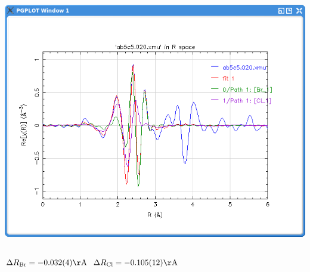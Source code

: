 \begin{frame}[fragile]
\begin{columns}[T]
\begin{column}{0.5\linewidth}
\begin{center}
        \includegraphics[width=0.9\linewidth]{images/abcfit_re}
      \end{center}

    \end{column}
  \end{columns}

  \medskip

  \begin{center}
    $\Delta R_\mathrm{Br}=-0.032(4)\mathrm{\AA}$ \qquad
    {\color{Red3}$\Delta R_\mathrm{Cl}=-0.105(12)\mathrm{\AA}$}
  \end{center}
\end{frame}

